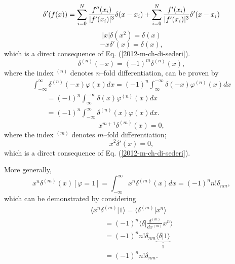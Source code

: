  \begin{equation}
 \delta '(f(x))=
\sum_{i=0}^N
{f'' (x_i)\over \vert f'(x_i)\vert ^3}
\delta (x-x_i) +
\sum_{i=0}^N
{f' (x_i)\over \vert f'(x_i)\vert ^3}
\delta ' (x-x_i)
 \end{equation}
 \begin{equation}
 \vert x\vert \delta (x^2)=\delta (x)
 \end{equation}
 \begin{equation}
 -x\delta '(x)=\delta (x),
 \end{equation}
which is a direct consequence of Eq. (\ref{2012-m-ch-di-sederi}).
 \begin{equation}
 \delta^{(n)}(-x) =(-1)^m\delta^{(n)}(x)
,
 \end{equation}
where the index $^{(n)}$ denotes $n$--fold differentiation,
can be proven by
{\color{OliveGreen}
\bproof
 \begin{equation}
 \begin{split}
\int _{-\infty}^\infty \delta^{(n)} (-x)  \varphi (x)  dx
 =
(-1)^n \int _\infty^{-\infty} \delta (-x)  \varphi^{(n)} (x) dx \\
\qquad =
(-1)^n \int _\infty^{-\infty} \delta (x)  \varphi^{(n)} (x) dx       \\
\qquad = (-1)^n  \int _{-\infty}^\infty \delta^{(n)} (x)  \varphi (x)  dx     .
 \end{split}
 \end{equation}
\eproof
}
 \begin{equation}
 x^{m+1}\delta^{(m)}(x)=0
,
 \end{equation}
 where the index $^{(m)}$ denotes $m$--fold differentiation;
 \begin{equation}
 x^2\delta '(x)=0,
 \end{equation}
which is a direct consequence of Eq. (\ref{2012-m-ch-di-sederi}).

More generally,
 \begin{equation}
x^n\delta^{(m)}(x)[\varphi =1] = \int _{-\infty}^\infty x^n\delta^{(m)}(x) dx  = (-1)^n n! \delta_{nm},
 \end{equation}
{\color{OliveGreen} \bproof
which can be demonstrated by considering
 \begin{equation}
 \begin{split}
 \langle x^n \delta^{(m)} \vert 1 \rangle
=
 \langle \delta^{(m)} \vert  x^n \rangle    \\ \qquad
=
(-1)^n
 \langle \delta \vert \frac{d^{(m)}}{d x^{(m)}}  x^n \rangle    \\ \qquad
=
(-1)^n n! \delta_{nm}
 \underbrace{\langle \delta \vert 1 \rangle}_{1}      \\ \qquad
=
(-1)^n n! \delta_{nm} .
\end{split}
 \end{equation}
\eproof
}

